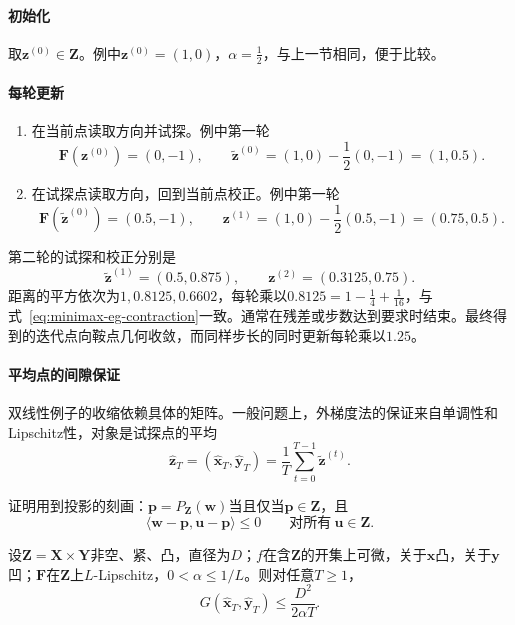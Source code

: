\paragraph{初始化}
取$\bm{z}^{(0)}\in\bm{Z}$。例中$\bm{z}^{(0)}=(1,0)$，$\alpha=\frac12$，与上一节相同，便于比较。

\paragraph{每轮更新}
\begin{enumerate}
 \item 在当前点读取方向并试探。例中第一轮
 \[
  \bm{F}(\bm{z}^{(0)})=(0,-1),\qquad\tilde{\bm{z}}^{(0)}=(1,0)-\frac12(0,-1)=(1,0.5).
 \]
 \item 在试探点读取方向，回到当前点校正。例中第一轮
 \[
  \bm{F}(\tilde{\bm{z}}^{(0)})=(0.5,-1),\qquad\bm{z}^{(1)}=(1,0)-\frac12(0.5,-1)=(0.75,0.5).
 \]
\end{enumerate}

第二轮的试探和校正分别是
\[
 \tilde{\bm{z}}^{(1)}=(0.5,0.875),\qquad\bm{z}^{(2)}=(0.3125,0.75).
\]
距离的平方依次为$1,0.8125,0.6602$，每轮乘以$0.8125=1-\frac14+\frac1{16}$，与式~\eqref{eq:minimax-eg-contraction}一致。通常在残差或步数达到要求时结束。最终得到的迭代点向鞍点几何收敛，而同样步长的同时更新每轮乘以$1.25$。

\paragraph{平均点的间隙保证}
双线性例子的收缩依赖具体的矩阵。一般问题上，外梯度法的保证来自单调性和Lipschitz性，对象是试探点的平均
\[
 \hat{\bm{z}}_T=(\hat{\bm{x}}_T,\hat{\bm{y}}_T)=\frac1T\sum_{t=0}^{T-1}\tilde{\bm{z}}^{(t)}.
\]

证明用到投影的刻画：$\bm{p}=P_{\bm{Z}}(\bm{w})$当且仅当$\bm{p}\in\bm{Z}$，且
\begin{equation}
 \langle\bm{w}-\bm{p},\bm{u}-\bm{p}\rangle\leq0\qquad\text{对所有}\ \bm{u}\in\bm{Z}.
 \label{eq:minimax-projection}
\end{equation}

\begin{theorem}[外梯度法的平均间隙]
\label{thm:minimax-eg-gap}
设$\bm{Z}=\bm{X}\times\bm{Y}$非空、紧、凸，直径为$D$；$f$在含$\bm{Z}$的开集上可微，关于$\bm{x}$凸，关于$\bm{y}$凹；$\bm{F}$在$\bm{Z}$上$L$-Lipschitz，$0<\alpha\leq1/L$。则对任意$T\geq1$，
\begin{equation}
 G(\hat{\bm{x}}_T,\hat{\bm{y}}_T)\leq\frac{D^2}{2\alpha T}.
 \label{eq:minimax-eg-gap}
\end{equation}
\end{theorem}

